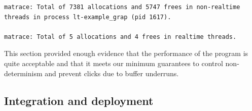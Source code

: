 \begin{mynote}
\label{note:matrace-output}\footnotesize
\begin{verbatim}
matrace: Total of 7381 allocations and 5747 frees in non-realtime 
threads in process lt-example_grap (pid 1617).

matrace: Total of 5 allocations and 4 frees in realtime threads.
\end{verbatim}
\end{mynote}

This section provided enough evidence that the performance of the
program is quite acceptable and that it meets our minimum guarantees
to control non-determinism and prevent clicks due to buffer underruns.

\subsection{Integration and deployment}
\label{sec:graph-integration}

